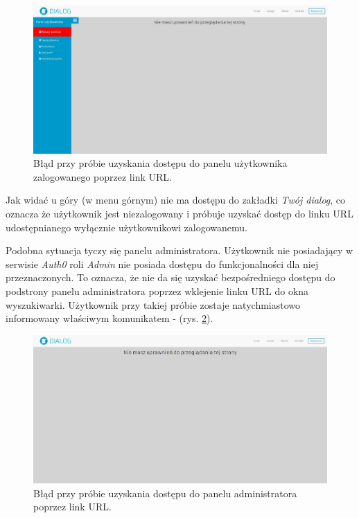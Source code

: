 \newpage

\begin{figure}[h]
	\centering\includegraphics[scale=0.25]{images/no_access.jpg}
	\caption{Błąd przy próbie uzyskania dostępu do panelu użytkownika zalogowanego poprzez link URL.}
	\label{Rys:no_access}
\end{figure}

Jak widać u góry (w menu górnym) nie ma dostępu do zakładki \textit{Twój dialog}, co oznacza że użytkownik jest niezalogowany i próbuje uzyskać dostęp do linku URL udostępnianego wyłącznie użytkownikowi zalogowanemu. 

Podobna sytuacja tyczy się panelu administratora. Użytkownik nie posiadający w serwisie \textit{Auth0} roli \textit{Admin} nie posiada dostępu do funkcjonalności dla niej przeznaczonych. To oznacza, że nie da się uzyskać bezpośredniego dostępu do podstrony panelu administratora poprzez wklejenie linku URL do okna wyszukiwarki. Użytkownik przy takiej próbie zostaje natychmiastowo informowany właściwym komunikatem - (rys. \ref{Rys:no_admin_access}).

\begin{figure}[h]
	\centering\includegraphics[scale=0.25]{images/no_admin_access.jpg}
	\caption{Błąd przy próbie uzyskania dostępu do panelu administratora poprzez link URL.}
	\label{Rys:no_admin_access}
\end{figure}